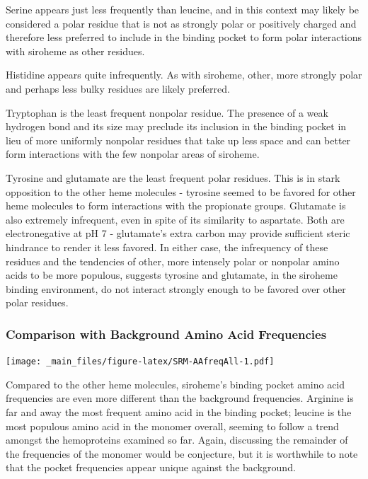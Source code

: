 \documentclass[a4paper, nobind]{templates/ociamthesis}
\let\origfigure\figure
\let\endorigfigure\endfigure
\renewenvironment{figure}[1][2] {
    \expandafter\origfigure\expandafter[H]
} {
    \endorigfigure
}
\begin{document}
Serine appears just less frequently than leucine, and in this context may likely be considered a polar residue that is not as strongly polar or positively charged and therefore less preferred to include in the binding pocket to form polar interactions with siroheme as other residues.

Histidine appears quite infrequently. As with siroheme, other, more strongly polar and perhaps less bulky residues are likely preferred.

Tryptophan is the least frequent nonpolar residue. The presence of a weak hydrogen bond and its size may preclude its inclusion in the binding pocket in lieu of more uniformly nonpolar residues that take up less space and can better form interactions with the few nonpolar areas of siroheme.

Tyrosine and glutamate are the least frequent polar residues. This is in stark opposition to the other heme molecules - tyrosine seemed to be favored for other heme molecules to form interactions with the propionate groups. Glutamate is also extremely infrequent, even in spite of its similarity to aspartate. Both are electronegative at pH 7 - glutamate's extra carbon may provide sufficient steric hindrance to render it less favored. In either case, the infrequency of these residues and the tendencies of other, more intensely polar or nonpolar amino acids to be more populous, suggests tyrosine and glutamate, in the siroheme binding environment, do not interact strongly enough to be favored over other polar residues.

\hypertarget{comparison-with-background-amino-acid-frequencies-3}{%
\subsubsection{Comparison with Background Amino Acid Frequencies}\label{comparison-with-background-amino-acid-frequencies-3}}

\begin{figure}
\centering
\texttt{[image: \_main\_files/figure-latex/SRM-AAfreqAll-1.pdf]}
\caption{\label{fig:SRM-AAfreqAll}SRM: AA Frequency of Monomer}
\end{figure}

Compared to the other heme molecules, siroheme's binding pocket amino acid frequencies are even more different than the background frequencies. Arginine is far and away the most frequent amino acid in the binding pocket; leucine is the most populous amino acid in the monomer overall, seeming to follow a trend amongst the hemoproteins examined so far. Again, discussing the remainder of the frequencies of the monomer would be conjecture, but it is worthwhile to note that the pocket frequencies appear unique against the background.
\end{document}
